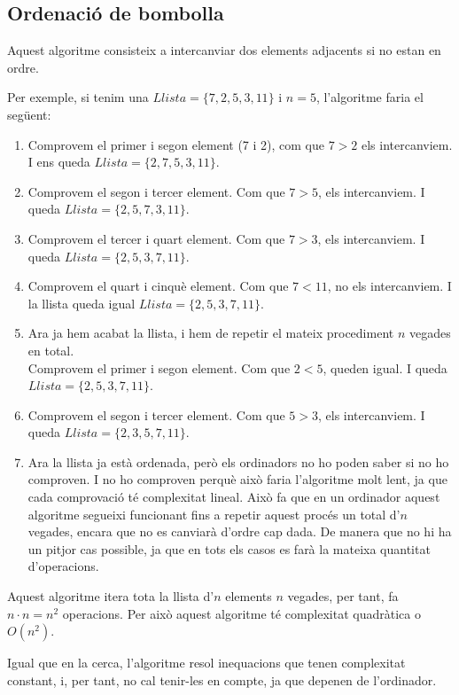 \subsection{Ordenació de bombolla}
Aquest algoritme consisteix a intercanviar dos elements adjacents si no estan en ordre.

Per exemple, si tenim una $Llista = \lbrace7, 2, 5, 3, 11\rbrace$ i $n = 5$, l'algoritme faria el següent:

\begin{enumerate}
    \item Comprovem el primer i segon element (7 i 2), com que $7 > 2$ els intercanviem. I ens queda $Llista = \lbrace2, 7, 5, 3, 11\rbrace$.
    \item Comprovem el segon i tercer element. Com que $7 > 5$, els intercanviem. I queda $Llista = \lbrace2, 5, 7, 3, 11\rbrace$.
    \item Comprovem el tercer i quart element. Com que $7 > 3$, els intercanviem. I queda $Llista = \lbrace2, 5, 3, 7, 11\rbrace$.
    \item Comprovem el quart i cinquè element. Com que $7 < 11$, no els intercanviem. I la llista queda igual $Llista = \lbrace2, 5, 3, 7, 11\rbrace$.
    \item Ara ja hem acabat la llista, i hem de repetir el mateix procediment $n$ vegades en total. \\ Comprovem el primer i segon element. Com que $2 < 5$, queden igual. I queda $Llista = \lbrace2, 5, 3, 7, 11\rbrace$.
    \item Comprovem el segon i tercer element. Com que $5 > 3$, els intercanviem. I queda $Llista = \lbrace2, 3, 5, 7, 11\rbrace$.
    \item Ara la llista ja està ordenada, però els ordinadors no ho poden saber si no ho comproven. I no ho comproven perquè això faria l'algoritme molt lent, ja que cada comprovació té complexitat lineal. Això fa que en un ordinador aquest algoritme segueixi funcionant fins a repetir aquest procés un total d'$n$ vegades, encara que no es canviarà d'ordre cap dada. De manera que no hi ha un pitjor cas possible, ja que en tots els casos es farà la mateixa quantitat d'operacions.
\end{enumerate}

Aquest algoritme itera tota la llista d'$n$ elements $n$ vegades, per tant, fa $n \cdot n = n^2$ operacions. Per això aquest algoritme té complexitat quadràtica o $O(n^2)$. 

Igual que en la cerca, l'algoritme resol inequacions que tenen complexitat constant, i, per tant, no cal tenir-les en compte, ja que depenen de l'ordinador.

